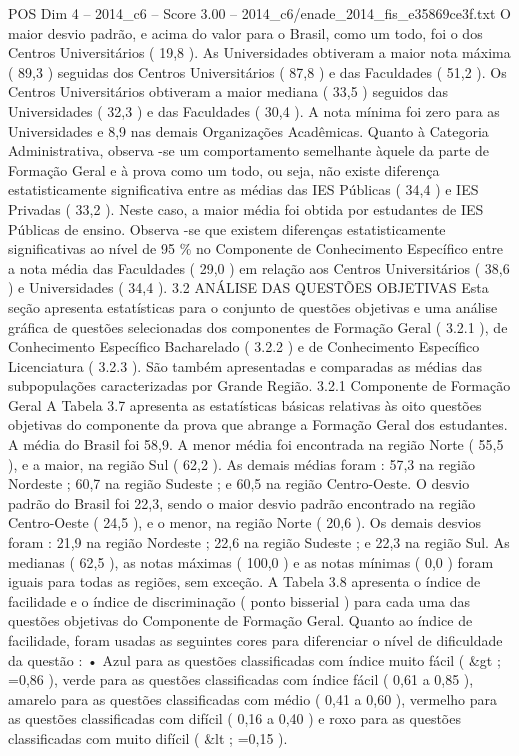 \begin{textsample}{POS Dim 4 – 2014\_c6 – Score 3.00 – 2014\_c6/enade\_2014\_fis\_e35869ce3f.txt}
O maior desvio padrão, e acima do valor para o Brasil, como um todo, foi o dos Centros Universitários ( 19,8 ).
As Universidades obtiveram a maior nota máxima ( 89,3 ) seguidas dos Centros Universitários ( 87,8 ) e das Faculdades ( 51,2 ).
Os Centros Universitários obtiveram a maior mediana ( 33,5 ) seguidos das Universidades ( 32,3 ) e das Faculdades ( 30,4 ).
A nota mínima foi zero para as Universidades e 8,9 nas demais Organizações Acadêmicas.
Quanto à Categoria Administrativa, observa -se um comportamento semelhante àquele da parte de Formação Geral e à prova como um todo, ou seja, não existe diferença estatisticamente significativa entre as médias das IES Públicas ( 34,4 ) e IES Privadas ( 33,2 ).
Neste caso, a maior média foi obtida por estudantes de IES Públicas de ensino.
Observa -se que existem diferenças estatisticamente significativas ao nível de 95 \% no Componente de Conhecimento Específico entre a nota média das Faculdades ( 29,0 ) em relação aos Centros Universitários ( 38,6 ) e Universidades ( 34,4 ). 3.2 ANÁLISE DAS QUESTÕES OBJETIVAS Esta seção apresenta estatísticas para o conjunto de questões objetivas e uma análise gráfica de questões selecionadas dos componentes de Formação Geral ( 3.2.1 ), de Conhecimento Específico Bacharelado ( 3.2.2 ) e de Conhecimento Específico Licenciatura ( 3.2.3 ).
São também apresentadas e comparadas as médias das subpopulações caracterizadas por Grande Região. 3.2.1 Componente de Formação Geral A Tabela 3.7 apresenta as estatísticas básicas relativas às oito questões objetivas do componente da prova que abrange a Formação Geral dos estudantes.
A média do Brasil foi 58,9.
A menor média foi encontrada na região Norte ( 55,5 ), e a maior, na região Sul ( 62,2 ).
As demais médias foram : 57,3 na região Nordeste ; 60,7 na região Sudeste ; e 60,5 na região Centro-Oeste.
O desvio padrão do Brasil foi 22,3, sendo o maior desvio padrão encontrado na região Centro-Oeste ( 24,5 ), e o menor, na região Norte ( 20,6 ).
Os demais desvios foram : 21,9 na região Nordeste ; 22,6 na região Sudeste ; e 22,3 na região Sul.
As medianas ( 62,5 ), as notas máximas ( 100,0 ) e as notas mínimas ( 0,0 ) foram iguais para todas as regiões, sem exceção.
A Tabela 3.8 apresenta o índice de facilidade e o índice de discriminação ( ponto bisserial ) para cada uma das questões objetivas do Componente de Formação Geral.
Quanto ao índice de facilidade, foram usadas as seguintes cores para diferenciar o nível de dificuldade da questão : • Azul para as questões classificadas com índice muito fácil ( \&gt ; =0,86 ), verde para as questões classificadas com índice fácil ( 0,61 a 0,85 ), amarelo para as questões classificadas com médio ( 0,41 a 0,60 ), vermelho para as questões classificadas com difícil ( 0,16 a 0,40 ) e roxo para as questões classificadas com muito difícil ( \&lt ; =0,15 ).

\end{textsample}
